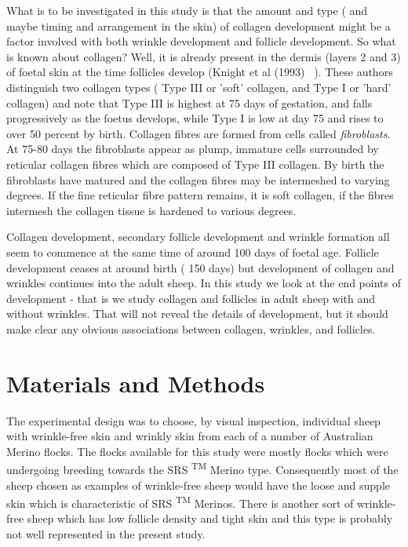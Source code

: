 \documentclass[titlepage]{article}  %
\begin{document}
What is to be investigated in this study is that the amount and type ( and maybe timing and arrangement in the skin) of collagen development might be a factor involved with both wrinkle development and follicle development. So what is known about collagen? Well, it is already present in the dermis (layers 2 and 3) of foetal skin at the time follicles develop (Knight et al (1993) ~\cite{knig:93}). 
 These authors distinguish two collagen types ( Type III or 'soft' collagen, and Type I or 'hard' collagen) and note  that Type III is highest at 75 days of gestation, and falls progressively as the foetus develops, while Type I is low at day 75 and rises to over 50 percent by birth. Collagen fibres are formed from cells called {\em fibroblasts}. At 75-80 days the fibroblasts appear as plump, immature cells surrounded by reticular collagen fibres which are composed of Type III collagen. By birth the fibroblasts have matured  and the collagen fibres may be intermeshed to varying degrees. If the fine reticular fibre pattern remains, it is soft collagen, if the fibres intermesh the collagen tissue is hardened to various degrees. 

Collagen development, secondary follicle development and wrinkle formation  all seem to commence at the same time of around 100 days of foetal age.  Follicle development ceases at around birth ( 150 days) but development of collagen and wrinkles continues into the adult sheep. In this study we look at the end points of development - that is we study collagen and follicles in adult sheep with and without wrinkles. That will not reveal the details of development, but it should make clear any obvious associations between collagen, wrinkles, and follicles.

\section{Materials and Methods}
The experimental design was to choose, by visual inspection, individual sheep with wrinkle-free skin and wrinkly skin from each of a number of Australian Merino flocks. The flocks available for this study were mostly flocks which were undergoing breeding towards the SRS \textsuperscript{TM} Merino type. Consequently most of the sheep chosen as examples of wrinkle-free sheep would have the loose and supple skin which is characteristic of SRS \textsuperscript{TM} Merinos. There is another sort of wrinkle-free sheep which has low follicle density and tight skin and this type is probably not well represented in the present study.
\end{document}
